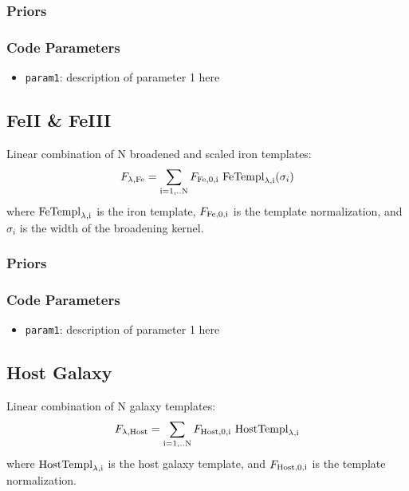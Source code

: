 \documentclass[12pt,letterpaper]{article}
\begin{document}
\subsubsection*{Priors}

\subsubsection*{Code Parameters}

\begin{itemize}
    \item {\tt param1}: description of parameter 1 here
\end{itemize}

\subsection*{FeII \& FeIII}
Linear combination of N broadened and scaled iron templates:
\begin{equation}
F_{\lambda {\rm{,Fe}}} = \sum_{\rm i=1,..N} F_{\rm{Fe,0,i}} \  {\rm FeTempl}_{\rm{\lambda,i}}(\sigma_i) 
\end{equation}
where ${\rm FeTempl}_{\rm{\lambda,i}}$ is the iron template, $F_{\rm Fe,0,i}$ is the template normalization, and $\sigma_i$ is the 
width of the broadening kernel.
\subsubsection*{Priors}

\subsubsection*{Code Parameters}

\begin{itemize}
    \item {\tt param1}: description of parameter 1 here
\end{itemize}

\subsection*{Host Galaxy}
Linear combination of N galaxy templates:
\begin{equation}
F_{\lambda {\rm{,Host}}} = \sum_{\rm i=1,..N} F_{\rm{Host,0,i}} \  {\rm HostTempl}_{\rm{\lambda,i}} 
\end{equation}
where ${\rm HostTempl}_{\rm{\lambda,i}}$ is the host galaxy template, and $F_{\rm Host,0,i}$ is the template normalization.\\
\end{document}
